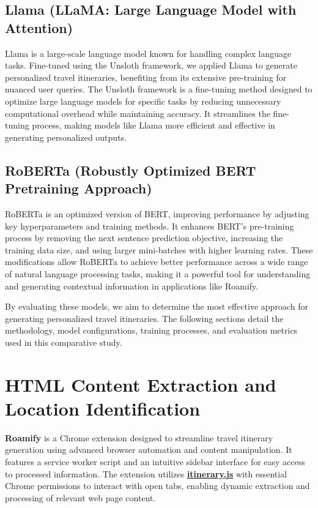 \documentclass[conference]{IEEEtran}
\begin{document}
    \subsection{Llama (LLaMA: Large Language Model with Attention)}
        Llama is a large-scale language model known for handling complex language tasks. Fine-tuned using the Unsloth framework, we applied Llama to generate personalized travel itineraries, benefiting from its extensive pre-training for nuanced user queries.
        The Unsloth framework is a fine-tuning method designed to optimize large language models for specific tasks by reducing unnecessary computational overhead while maintaining accuracy. It streamlines the fine-tuning process, making models like Llama more efficient and effective in generating personalized outputs.


    \subsection{RoBERTa (Robustly Optimized BERT Pretraining Approach)}
        RoBERTa is an optimized version of BERT, improving performance by adjusting key hyperparameters and training methods. It enhances BERT's pre-training process by removing the next sentence prediction objective, increasing the training data size, and using larger mini-batches with higher learning rates. These modifications allow RoBERTa to achieve better performance across a wide range of natural language processing tasks, making it a powerful tool for understanding and generating contextual information in applications like Roamify.

    By evaluating these models, we aim to determine the most effective approach for generating personalized travel itineraries. The following sections detail the methodology, model configurations, training processes, and evaluation metrics used in this comparative study.


\section{HTML Content Extraction and Location Identification}

    \textbf{Roamify} is a Chrome extension designed to streamline travel itinerary generation using advanced browser automation and content manipulation. It features a service worker script and an intuitive sidebar interface for easy access to processed information. The extension utilizes \href{https://github.com/Roamify-Research/Extension/blob/main/src/scripts/itinerary.js}{\textbf{itinerary.js}} with essential Chrome permissions to interact with open tabs, enabling dynamic extraction and processing of relevant web page content.
\end{document}

